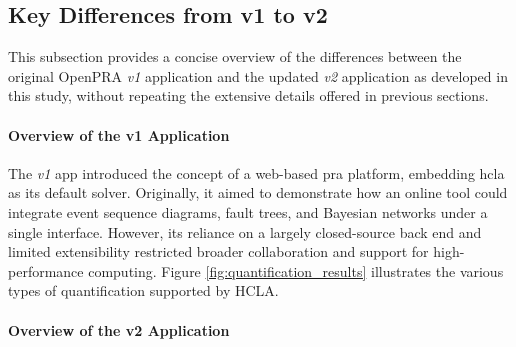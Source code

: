 \subsection{Key Differences from v1 to v2}
\label{sec:distinguish-v1-v2}
This subsection provides a concise overview of the differences between the original OpenPRA \textit{v1} application and the updated \textit{v2} application as developed in this study, without repeating the extensive details offered in previous sections.

\paragraph{Overview of the v1 Application}
The \textit{v1} app introduced the concept of a web-based \acrshort{pra} platform, embedding \acrshort{hcla} as its default solver. Originally, it aimed to demonstrate how an online tool could integrate event sequence diagrams, fault trees, and Bayesian networks under a single interface. However, its reliance on a largely closed-source back end and limited extensibility restricted broader collaboration and support for high-performance computing. Figure \ref{fig:quantification_results} illustrates the various types of quantification supported by HCLA.

\paragraph{Overview of the v2 Application}

\begin{comment}
The \textit{v2} update was driven by the need to improve openness, scalability, and solver flexibility. Three major goals encapsulate these objectives:
\begin{enumerate}
    \item \textbf{Architectural overhaul for extensibility and maintainability}, ensuring that new quantification methods or specialized back ends can be more easily integrated. 
    \item \textbf{Distributed computing and parallelization}, allowing a larger number of simultaneous analyses and more rigorous Monte Carlo sampling under high-throughput demands. 
    \item \textbf{Open-source licensing and community involvement}, encouraging collaboration from researchers and practitioners who can actively contribute domain-specific plug-ins or enhancements.
\end{enumerate}

\subsubsection{Architectural and Implementation Differences}
\subsubsection{Solver Integration and Model Exchange}
\subsubsection{Performance and Scalability Enhancements}
\end{comment}

